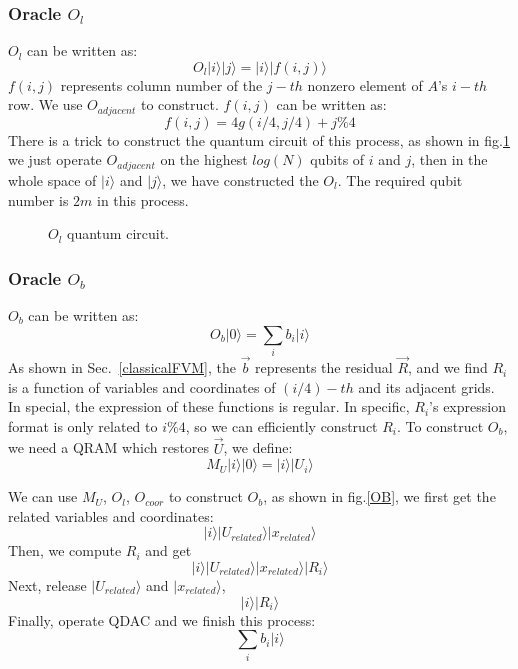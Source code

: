 \documentclass[%
 reprint,
 amsmath,amssymb,
pra,
]{revtex4-1}
\begin{document}
\begin{itemize}
\subsubsection{Oracle $O_l$}
$O_l$ can be written as:
$$
O_l|i\rangle|j\rangle=|i\rangle|f(i,j)\rangle
$$
$f(i,j)$ represents column number of the $j-th$ nonzero element of $A$'s $i-th$ row. We use $O_{adjacent}$ to construct. $f(i,j)$ can be written as:
$$
f(i,j)=4g(i/4,j/4)+j\%4
$$
There is a trick to construct the quantum circuit of this process, as shown in fig.\ref{OL} we just operate $O_{adjacent}$ on the highest $log(N)$ qubits of $i$ and $j$, then in the whole space of $|i\rangle$ and $|j\rangle$, we have constructed the $O_l$. The required qubit number is $2m$ in this process. 

\begin{figure}[htbp]
    \caption{$O_l$ quantum circuit. }
    \label{OL}
\end{figure}


\subsubsection{Oracle $O_b$}
$O_b$ can be written as:
$$
O_b|0\rangle=\sum_i{b_i|i\rangle}
$$
As shown in Sec.~\ref{classicalFVM}, the $\vec{b}$ represents the residual $\vec{R}$, and we find $R_i$ is a function of variables and coordinates of $(i/4)-th$ and its adjacent grids. In special, the expression of these functions is regular. In specific, $R_i$'s expression format is only related to $i\%4$, so we can efficiently construct $R_i$. To construct $O_b$, we need a QRAM which restores $\vec{U}$, we define:
$$
M_U|i\rangle|0\rangle=|i\rangle|U_i\rangle
$$

We can use $M_U$, $O_l$, $O_{coor}$ to construct $O_b$, as shown in fig.\ref{OB}, we first get the related variables and coordinates:
$$
|i\rangle|U_{related}\rangle|x_{related}\rangle
$$
Then, we compute $R_i$ and get
$$
|i\rangle|U_{related}\rangle|x_{related}\rangle|R_i\rangle
$$
Next, release $|U_{related}\rangle$ and $|x_{related}\rangle$,
$$
|i\rangle|R_i\rangle
$$
Finally, operate QDAC and we finish this process:
$$
\sum_i{b_i|i\rangle}
$$


\end{itemize}
\end{document}
